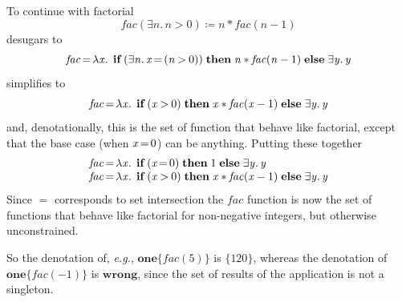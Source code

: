 \documentclass[acmsmall,review,dvipsnames]{acmart}
\newcommand{\Varid}[1]{\mathit{#1}}
\newcommand{\eg}{\emph{e.g.}}
\newcommand{\wrong}{\mathbf{wrong}}
\begin{document}
To continue with factorial
$$
\ensuremath{\Varid{fac}(\exists\Varid{n}.\,\Varid{n}\mathbin{>}\mathrm{0})\mathrel{\coloneqq}\Varid{n}\mathbin{*}\Varid{fac}(\Varid{n}\mathbin{-}\mathrm{1})}
$$
desugars to
$$
\ensuremath{\Varid{fac}\hspace{-0.14em}=\hspace{-0.14em}\lambda\Varid{x}.\,\;\textbf{if}\;(\exists\Varid{n}.\,\Varid{x}\hspace{-0.14em}=\hspace{-0.14em}(\Varid{n}\mathbin{>}\mathrm{0}))\;\textbf{then}\;\Varid{n}\mathbin{*}\Varid{fac}(\Varid{n}\mathbin{-}\mathrm{1})\;\textbf{else}\;\exists\Varid{y}.\,\Varid{y}}
$$
simplifies to
$$
\ensuremath{\Varid{fac}\hspace{-0.14em}=\hspace{-0.14em}\lambda\Varid{x}.\,\;\textbf{if}\;(\Varid{x}\mathbin{>}\mathrm{0})\;\textbf{then}\;\Varid{x}\mathbin{*}\Varid{fac}(\Varid{x}\mathbin{-}\mathrm{1})\;\textbf{else}\;\exists\Varid{y}.\,\Varid{y}}
$$
and, denotationally, this is the set of function that behave
like factorial, except that the base case (when \ensuremath{\Varid{x}\hspace{-0.14em}=\hspace{-0.14em}\mathrm{0}}) can be anything.
Putting these together
$$
\begin{array}{l}
\ensuremath{\Varid{fac}\hspace{-0.14em}=\hspace{-0.14em}\lambda\Varid{x}.\,\;\textbf{if}\;(\Varid{x}\hspace{-0.14em}=\hspace{-0.14em}\mathrm{0})\;\textbf{then}\;\mathrm{1}\;\textbf{else}\;\exists\Varid{y}.\,\Varid{y}} \\
\ensuremath{\Varid{fac}\hspace{-0.14em}=\hspace{-0.14em}\lambda\Varid{x}.\,\;\textbf{if}\;(\Varid{x}\mathbin{>}\mathrm{0})\;\textbf{then}\;\Varid{x}\mathbin{*}\Varid{fac}(\Varid{x}\mathbin{-}\mathrm{1})\;\textbf{else}\;\exists\Varid{y}.\,\Varid{y}}
\end{array}
$$
Since $=$ corresponds to set intersection the \ensuremath{\Varid{fac}} function is
now the set of functions that behave like factorial for non-negative integers,
but otherwise unconstrained.

So the denotation of, \eg, \ensuremath{\textbf{one}\{\Varid{fac}(\mathrm{5})\}} is $\{120\}$, whereas
the denotation of \ensuremath{\textbf{one}\{\Varid{fac}(\mathbin{-}\mathrm{1})\}} is $\wrong$, since the set
of results of the application is not a singleton.
\end{document}

